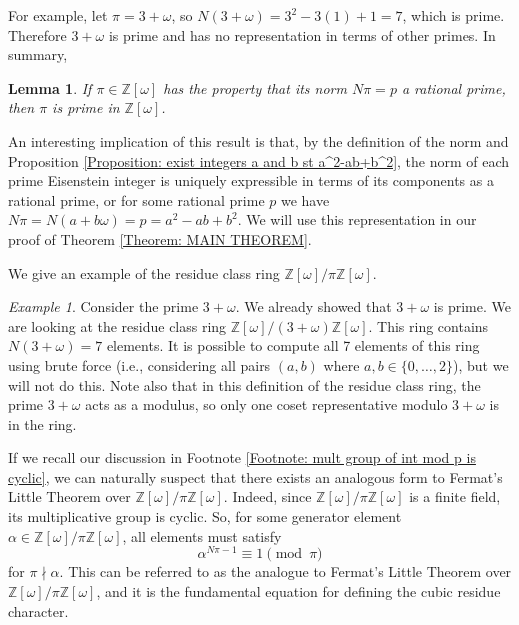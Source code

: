 \documentclass[10pt]{amsart}
\newcommand{\ZZ}{\mathbb{Z}}
\theoremstyle{plain}
\newtheorem{lemma}[thm]{Lemma}
\theoremstyle{definition}
\theoremstyle{remark}
\newtheorem{ex}{Example}
\numberwithin{equation}{section}
\begin{document}
\indent For example, let $\pi=3+\omega$, so $N(3+\omega)=3^{2}-3(1)+1=7$, which is prime. Therefore $3+\omega$ is prime and has no representation in terms of other primes. In summary, 

\begin{lemma}\label{Lemma: Npi=p implies pi is prime in Z[omega]}
    If $\pi\in\ZZ[\omega]$ has the property that its norm $N\pi = p$ a rational prime, then $\pi$ is prime in $\ZZ[\omega]$. 
\end{lemma}

An interesting implication of this result is that, by the definition of the norm and Proposition \ref{Proposition: exist integers a and b st a^2-ab+b^2}, the norm of each prime Eisenstein integer is uniquely expressible in terms of its components as a rational prime, or for some rational prime $p$ we have $N\pi = N(a+b\omega) = p = a^{2}-ab+b^{2}$. We will use this representation in our proof of Theorem \ref{Theorem: MAIN THEOREM}. 

\indent We give an example of the residue class ring $\ZZ[\omega]/\pi\ZZ[\omega]$. 

\begin{ex}
    Consider the prime $3+\omega$. We already showed that $3+\omega$ is prime. We are looking at the residue class ring $\ZZ[\omega]/(3+\omega)\ZZ[\omega]$. This ring contains $N(3+\omega)=7$ elements. It is possible to compute all 7 elements of this ring using brute force (i.e., considering all pairs $(a,b)$ where $a,b\in\{ 0,\ldots,2\}$), but we will not do this. Note also that in this definition of the residue class ring, the prime $3+\omega$ acts as a modulus, so only one coset representative modulo $3+\omega$ is in the ring. 
\end{ex}

If we recall our discussion in Footnote \ref{Footnote: mult group of int mod p is cyclic}, we can naturally suspect that there exists an analogous form to Fermat's Little Theorem over $\ZZ[\omega]/\pi\ZZ[\omega]$. Indeed, since $\ZZ[\omega]/\pi\ZZ[\omega]$ is a finite field, its multiplicative group is cyclic. So, for some generator element $\alpha\in\ZZ[\omega]/\pi\ZZ[\omega]$, all elements must satisfy 
\begin{equation}
    \alpha^{N\pi-1}\equiv 1\pmod{\pi} \label{Equation: Analogue to FLT in Z[w]/piZ[w]}
\end{equation}
for $\pi\nmid\alpha$. This can be referred to as the analogue to Fermat's Little Theorem over $\ZZ[\omega]/\pi\ZZ[\omega]$, and it is the fundamental equation for defining the cubic residue character. 
\end{document}
